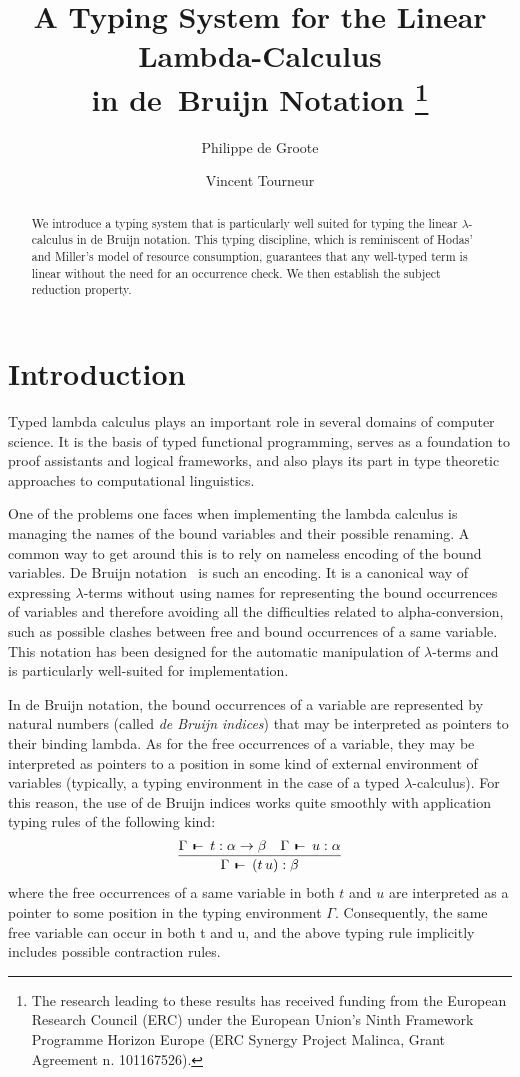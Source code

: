 \documentclass[submission,creativecommons]{eptcs}
\title{A Typing System for the Linear Lambda-Calculus\\ in \mbox{de Bruijn} Notation%
\thanks{%
The research leading to these results has received funding from the European Research Council (ERC)
under the European Union's Ninth Framework Programme Horizon Europe (ERC Synergy Project Malinca,
Grant Agreement n. 101167526).}}
\author{%
Philippe de Groote
\institute{LORIA, UMR 7503,\\ Universit{\'e} de Lorraine, CNRS, Inria,\\ 54000 Nancy, France}
%
\and
Vincent Tourneur
\institute{LORIA, UMR 7503,\\ Universit{\'e} de Lorraine, CNRS, Inria,\\ 54000 Nancy, France}
}
\def\joinrelm{\mathrel{\mkern-3mu}}
\def\relbar{\mathrel{\smash-}}
\def\tailpiece{\mathchoice
  {\vrule height 1ex width 0.3ex depth -.1ex}%
  {\vrule height 1ex width 0.3ex depth -.1ex}%
  {\vrule height 0.7ex width 0.3ex depth -.1ex}%
  {\vrule height 0.7ex width 0.3ex depth -.1ex}}
\def\seqsym{\mathrel{\tailpiece\joinrelm\relbar}}
\newcommand{\iapp}[2]{(#1\,#2)}
\newcommand{\tseq}[3]{#1 \, \seqsym \, #2 : #3}
\begin{document}
\maketitle

\begin{abstract}
We introduce a typing system that is particularly well suited for typing the linear $\lambda$-calculus
in de Bruijn notation. This typing discipline, which is reminiscent of Hodas' and Miller's model of resource
consumption, guarantees that any well-typed term is linear without the need for an occurrence check.
We then establish the subject reduction property.
\end{abstract}

\section{Introduction}

Typed lambda calculus plays an important role in several domains of computer science.
It is the basis of typed functional programming, serves as a foundation to proof assistants and logical
frameworks, and also plays its part in type theoretic approaches to computational linguistics.

One of the problems one faces when implementing the lambda calculus is managing the names of the bound variables
and their possible renaming. A common way to get around this is to rely on nameless encoding of the bound
variables.
De Bruijn notation~\cite{deBruijn:indices} is such an encoding.
It is a canonical way of expressing $\lambda$-terms without using names
for representing the bound occurrences of variables and therefore avoiding all the difficulties related
to alpha-conversion, such as possible clashes between free and bound occurrences of a same variable.
This notation has been designed for the automatic manipulation of $\lambda$-terms and is particularly
well-suited for implementation.

In de Bruijn notation, the bound occurrences of a variable are represented by natural numbers
(called \emph{de Bruijn indices}) that may be interpreted as pointers to their binding lambda.
As for the free occurrences of a variable, they may be interpreted as pointers to a position in some kind of
external environment of variables (typically, a typing environment in the case of a
typed $\lambda$-calculus).
For this reason, the use of de Bruijn indices works quite smoothly with application typing rules of the
following kind:
\begin{align*}
\infer{
\tseq{\Gamma}{\iapp{t}{u}}{\beta}}{
\tseq{\Gamma}{t}{\alpha \rightarrow \beta}
&
\tseq{\Gamma}{u}{\alpha}}
\end{align*}
where the free occurrences of a same variable in both $t$ and $u$ are interpreted as a pointer to some position
in the typing environment $\Gamma$.
Consequently, the same free variable can occur in both t and u, and the above typing rule implicitly includes
possible contraction rules. 
\end{document}
